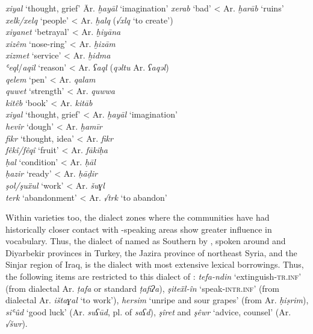 \documentclass[output=paper]{langsci/langscibook}
\begin{document}
\ea
\begin{tabbing}
\textit{xiyal} ‘thought, grief’ \hspace{1em} \= Ar. \textit{ḫayāl} ‘imagination’\kill
\textit{xerab} ‘bad’     \> < Ar. \textit{ḫarāb} ‘ruins’\\
\textit{xelk/xelq} ‘people’  \> < Ar. \textit{ḫalq} (\textit{√xlq} ‘to create’)\\
\textit{xiyanet} ‘betrayal’  \> < Ar. \textit{ḫiyāna} \\
\textit{xizêm} ‘nose-ring’  \> < Ar. \textit{ḫizām}\\
\textit{xizmet} ‘service’  \> < Ar. \textit{ḫidma} \\
\textit{ʿeql}/\textit{aqil} ‘reason’  \> < Ar. \textit{ʕaql} (\textit{qəltu} Ar. \textit{ʕaqəl})\\
\textit{qelem} ‘pen’    \> < Ar. \textit{qalam}\\
\textit{quwet} ‘strength’  \> < Ar. \textit{quwwa}\\
\textit{kitêb} ‘book’    \> < Ar. \textit{kitāb}\\
\textit{xiyal} ‘thought, grief’  \> < Ar. \textit{ḫayāl} ‘imagination’\\
\textit{hevîr} ‘dough’    \> < Ar. \textit{ḫamīr} \\
\textit{fikr} ‘thought, idea’  \> < Ar. \textit{fikr}\\
\textit{fêkî/fêqî} ‘fruit’  \> < Ar. \textit{fākiḥa}\\
\textit{ḥal} ‘condition’  \> < Ar. \textit{ḥāl} \\
\textit{ḥazir} ‘ready’    \> < Ar. \textit{ḥāḍir}\\
\textit{şol/şuẍul} ‘work’  \> < Ar. \textit{šuɣl} \\
\textit{terk} ‘abandonment’  \> < Ar. \textit{√trk} ‘to abandon’
\end{tabbing}
\z

Within varieties too, the dialect zones where the communities have had historically closer contact with -speaking areas show greater  influence in vocabulary. Thus, the dialect of  named as Southern  by  \citet{ÖpenginHaig2014}, spoken around  and Diyarbekir provinces in Turkey, the Jazira province of northeast Syria, and the Sinjar region of Iraq, is the dialect with most extensive  lexical borrowings. Thus, the following items are restricted to this dialect of : \textit{tefa-ndin} ‘extinguish-\textsc{tr.inf}’ (from dialectal Ar. \textit{ṭafa} or standard \textit{ṭafiʔa}), \textit{şiteẍl-în} ‘speak-\textsc{intr.inf}’ (from dialectal Ar. \textit{ištaɣal} ‘to work’), \textit{hersim} ‘unripe and sour grapes’ (from Ar. \textit{ḥiṣrim}), \textit{siʿûd} ‘good luck’ (Ar. \textit{suʕūd}, pl. of \textit{saʕd}), \textit{şîret} and \textit{şêwr} ‘advice, counsel’ (Ar. \textit{√šwr}).     
\end{document}
